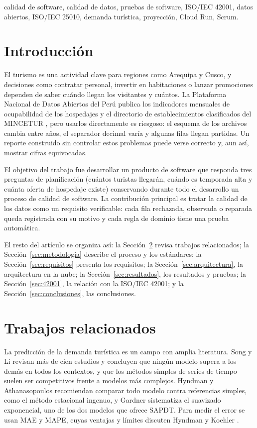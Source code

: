 \documentclass[conference]{IEEEtran}
\begin{document}
\begin{IEEEkeywords}
calidad de software, calidad de datos, pruebas de software, ISO/IEC 42001, datos abiertos, ISO/IEC 25010, demanda turística, proyección, Cloud Run, Scrum.
\end{IEEEkeywords}

\section{Introducción}
El turismo es una actividad clave para regiones como Arequipa y Cusco, y decisiones como contratar personal, invertir en habitaciones o lanzar promociones dependen de saber cuándo llegan los visitantes y cuántos. La Plataforma Nacional de Datos Abiertos del Perú publica los indicadores mensuales de ocupabilidad de los hospedajes y el directorio de establecimientos clasificados del MINCETUR \cite{pnda,mincetur}, pero usarlos directamente es riesgoso: el esquema de los archivos cambia entre años, el separador decimal varía y algunas filas llegan partidas. Un reporte construido sin controlar estos problemas puede verse correcto y, aun así, mostrar cifras equivocadas.

El objetivo del trabajo fue desarrollar un producto de software que responda tres preguntas de planificación (cuántos turistas llegarán, cuándo es temporada alta y cuánta oferta de hospedaje existe) conservando durante todo el desarrollo un proceso de calidad de software. La contribución principal es tratar la calidad de los datos como un requisito verificable: cada fila rechazada, observada o reparada queda registrada con su motivo y cada regla de dominio tiene una prueba automática.

El resto del artículo se organiza así: la Sección~\ref{sec:relacionados} revisa trabajos relacionados; la Sección~\ref{sec:metodologia} describe el proceso y los estándares; la Sección~\ref{sec:requisitos} presenta los requisitos; la Sección~\ref{sec:arquitectura}, la arquitectura en la nube; la Sección~\ref{sec:resultados}, los resultados y pruebas; la Sección~\ref{sec:42001}, la relación con la ISO/IEC 42001; y la Sección~\ref{sec:conclusiones}, las conclusiones.

\section{Trabajos relacionados}\label{sec:relacionados}
La predicción de la demanda turística es un campo con amplia literatura. Song y Li \cite{song2008} revisan más de cien estudios y concluyen que ningún modelo supera a los demás en todos los contextos, y que los métodos simples de series de tiempo suelen ser competitivos frente a modelos más complejos. Hyndman y Athanasopoulos \cite{hyndman2021} recomiendan comparar todo modelo contra referencias simples, como el método estacional ingenuo, y Gardner \cite{gardner1985} sistematiza el suavizado exponencial, uno de los dos modelos que ofrece SAPDT. Para medir el error se usan MAE y MAPE, cuyas ventajas y límites discuten Hyndman y Koehler \cite{hyndman2006}.
\end{document}
